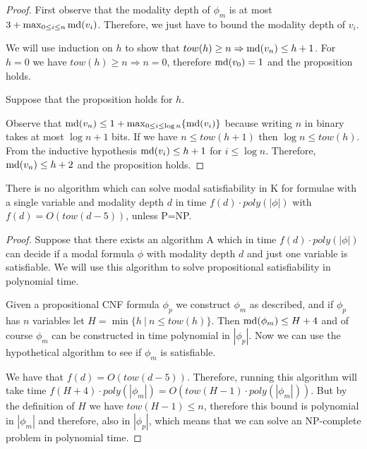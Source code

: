 \documentclass{llncs}
\newcommand{\md}{\ensuremath \textrm{md}}
\begin{document}
\begin{proof}

First observe that the modality depth of $\phi_m$ is at most $3+\max_{0\le i\le
n} \md(v_i)$. Therefore, we just have to bound the modality depth of $v_i$.

We will use induction on $h$ to show that $tow(h)\ge n \Rightarrow \md(v_n)\le
h+1$.  For $h=0$ we have $tow(h)\ge n \Rightarrow n=0$, therefore $\md(v_0)=1$
and the proposition holds.

Suppose that the proposition holds for $h$.

Observe that $\md(v_n) \le 1 +
\max_{0\le i \le \log n}\{  \md(v_i) \}$ because writing $n$ in binary takes at
most $\log n + 1$ bits. If we have $n \le tow(h+1)$ then $\log n \le tow(h)$.
From the inductive hypothesis $\md(v_i) \le h+1$ for $i\le \log n$.  Therefore,
$\md(v_n) \le h+2$ and the proposition holds. 

\end{proof}





\begin{theorem} \label{thm:lower}

There is no algorithm which can solve modal satisfiability in K for formulae
with a single variable and modality depth $d$ in time $f(d)\cdot poly(|\phi|)$
with $f(d) = O( tow(d-5))$, unless P=NP.

\end{theorem}

\begin{proof}

Suppose that there exists an algorithm A which in time $f(d)\cdot poly(|\phi|)$
can decide if a modal formula $\phi$ with modality depth $d$ and just one
variable is satisfiable. We will use this algorithm to solve propositional
satisfiability in polynomial time.

Given a propositional CNF formula $\phi_p$ we construct $\phi_m$ as described,
and if $\phi_p$ has $n$ variables let $H=\min\{h\ |\ n\le tow(h)\}$. Then
$\md(\phi_m)\le H+4$ and of course $\phi_m$ can be constructed in time
polynomial in $|\phi_p|$. Now we can use the hypothetical algorithm to see if
$\phi_m$ is satisfiable.

We have that $f(d)= O(tow(d-5))$. Therefore, running this algorithm will take
time $f(H+4)\cdot poly(|\phi_m|) = O(tow(H-1) \cdot poly(|\phi_m|))$.  But by
the definition of $H$ we have $tow(H-1)\le n$, therefore this bound is
polynomial in $|\phi_m|$ and therefore, also in $|\phi_p|$, which means that we
can solve an NP-complete problem in polynomial time. 

\end{proof}
 
\end{document}
